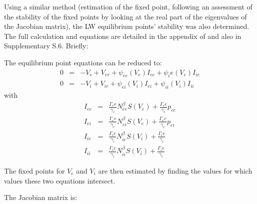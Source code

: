 \documentclass[12pt,twoside]{article}
\begin{document}
Using a similar method (estimation of the fixed point, following an assessment of the stability of the fixed points by looking at the real part of the eigenvalues of the Jacobian matrix), the LW equilibrium points' stability was also determined. The full calculation and equations are detailed in the appendix of \citet{hartoyo2019parameter} and also in Supplementary S.6. Briefly: 

The equilibrium point equations can be reduced to:
\begin{eqnarray}
    0 &=& -V_e + V_{er} + \psi_{ee}(V_e)I_{ee} + \psi_ie(V_e)I_{ie} \\
    0 &=& -V_i + V_{ir} + \psi_{ei}(V_i)I_{ei} + \psi_{ii}(V_i)I_{ii}
\end{eqnarray}
with
\begin{eqnarray}
    I_{ee} &=& \frac{\Gamma_ee}{\gamma_e}N_{ee}^{\beta}S(V_e) + \frac{\Gamma_ee}{\gamma_e}p_{ee} \\
    I_{ei} &=& \frac{\Gamma_ee}{\gamma_e}N_{ei}^{\beta}S(V_e) + \frac{\Gamma_ee}{\gamma_e}p_{ei} \\
    I_{ie} &=& \frac{\Gamma_ie}{\gamma_i}N_{ie}^{\beta}S(V_i) + \frac{\Gamma_ie}{\gamma_i} \\
    I_{ii} &=& \frac{\Gamma_ie}{\gamma_i}N_{ii}^{\beta}S(V_i) + \frac{\Gamma_ie}{\gamma_i}
\end{eqnarray}

The fixed points for $V_e$ and $V_i$ are then estimated by finding the values for which values these two equations intersect.

The Jacobian matrix is: 
\end{document}
